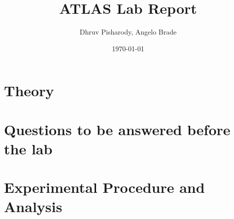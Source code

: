 \documentclass{article}
\title{ATLAS Lab Report}
\author{Dhruv Pisharody, Angelo Brade}
\date{\today}
\begin{document}
\maketitle

\tableofcontents

\newpage

\section{Theory}


\section{Questions to be answered before the lab}

 
\section{Experimental Procedure and Analysis}

\end{document}
